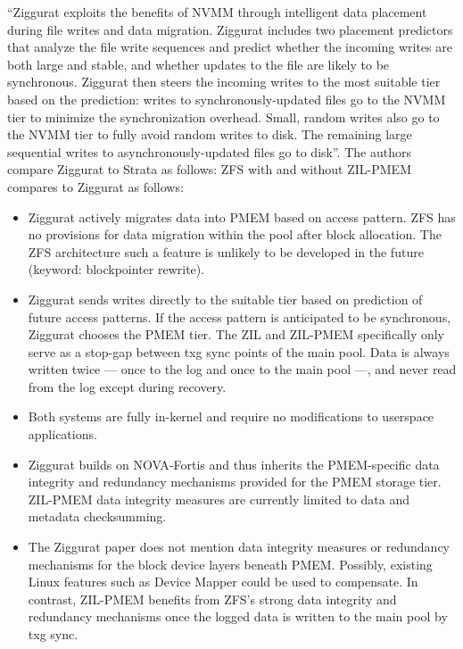 \documentclass[12pt,a4paper,twoside]{book}
\begin{document}
``Ziggurat exploits the benefits of NVMM through intelligent data placement during file writes and data migration.
Ziggurat includes two placement predictors that analyze the file write sequences and predict whether the incoming writes are both large and stable, and whether updates to the file are likely to be synchronous.
Ziggurat then steers the incoming writes to the most suitable tier based on the prediction: writes to synchronously-updated files go to the NVMM tier to minimize the synchronization overhead.
Small, random writes also go to the NVMM tier to fully avoid random writes to disk. The remaining large sequential writes to asynchronously-updated files go to disk''.
The authors compare Ziggurat to Strata as follows:
ZFS with and without ZIL-PMEM compares to Ziggurat as follows:
\begin{itemize}[noitemsep,beginpenalty=100000,midpenalty=100000]
    \item Ziggurat actively migrates data into PMEM based on access pattern.
          ZFS has no provisions for data migration within the pool after block allocation.
          The ZFS architecture such a feature is unlikely to be developed in the future (keyword: blockpointer rewrite).
    \item Ziggurat sends writes directly to the suitable tier based on prediction of future access patterns.
          If the access pattern is anticipated to be synchronous, Ziggurat chooses the PMEM tier.
          The ZIL and ZIL-PMEM specifically only serve as a stop-gap between txg sync points of the main pool.
          Data is always written twice --- once to the log and once to the main pool ---, and never read from the log except during recovery.
    \item Both systems are fully in-kernel and require no modifications to userspace applications.
    \item Ziggurat builds on NOVA-Fortis and thus inherits the PMEM-specific data integrity and redundancy mechanisms provided for the PMEM storage tier.
          ZIL-PMEM data integrity measures are currently limited to data and metadata checksumming.
    \item The Ziggurat paper does not mention data integrity measures or redundancy mechanisms for the block device layers beneath PMEM.
          Possibly, existing Linux features such as Device Mapper could be used to compensate.
          In contrast, ZIL-PMEM benefits from ZFS’s strong data integrity and redundancy mechanisms once the logged data is written to the main pool by txg sync.

\end{itemize}
\end{document}
